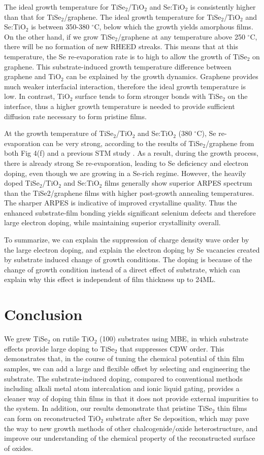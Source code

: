 \documentclass[journal=nalefd,manuscript=letter]{achemso}
\begin{document}
The ideal growth temperature for TiSe$_2$/TiO$_2$ and Se:TiO$_2$ is consistently higher than that for TiSe$_2$/graphene.
The ideal growth temperature for TiSe$_2$/TiO$_2$ and Se:TiO$_2$ is between 350-380 $^\circ$C, below which the growth yields amorphous films.
On the other hand, if we grow TiSe$_2$/graphene at any temperature above 250 $^\circ$C, there will be no formation of new RHEED streaks. 
This means that at this temperature, the Se re-evaporation rate is to high to allow the growth of TiSe$_2$ on graphene. 
This substrate-induced growth temperature difference between graphene and TiO$_2$ can be explained by the growth dynamics. 
Graphene provides much weaker interfacial interaction, therefore the ideal growth temperature is low.
In contrast, TiO$_2$ surface tends to form stronger bonds with TiSe$_2$ on the interface, thus a higher growth temperature is needed to provide sufficient diffusion rate necessary to form pristine films.

At the growth temperature of TiSe$_2$/TiO$_2$ and Se:TiO$_2$ (380 $^\circ$C), Se re-evaporation can be very strong, according to the results of TiSe$_2$/graphene from both Fig 4(f) and a previous STM study \cite{PengMa15prb}.
As a result, during the growth process, there is already strong Se re-evaporation, leading to Se deficiency and electron doping, even though we are growing in a Se-rich regime.
However, the heavily doped TiSe$_2$/TiO$_2$ and Se:TiO$_2$ films generally show superior ARPES spectrum than the TiSe2/graphene films with higher post-growth annealing temperatures.
The sharper ARPES is indicative of improved crystalline quality.  
Thus the enhanced substrate-film bonding yields significant selenium defects and therefore large electron doping, while maintaining superior crystallinity overall.

To summarize, we can explain the suppression of charge density wave order by the large electron doping, and explain the electron doping by Se vacancies created by substrate induced change of growth conditions.
The doping is because of the change of growth condition instead of a direct effect of substrate, which can explain why this effect is independent of film thickness up to 24ML.


\section{Conclusion}
We grew TiSe$_2$ on rutile TiO$_2$ (100) substrates using MBE, in which substrate effects provide large doping to TiSe$_2$ that suppresses CDW order.
This demonstrates that, in the course of tuning the chemical potential of thin film samples, we can add a large and flexible offset by selecting and engineering the substrate.
The substrate-induced doping, compared to conventional methods including alkali metal atom intercalation and ionic liquid gating, provides a cleaner way of doping thin films in that it does not provide external impurities to the system.
In addition, our results demonstrate that pristine TiSe$_2$ thin films can form on reconstructed TiO$_2$ substrate after Se deposition, which may pave the way to new growth methods of other chalcogenide/oxide heterostructure, and improve our understanding of the chemical property of the reconstructed surface of oxides. 
\end{document}
